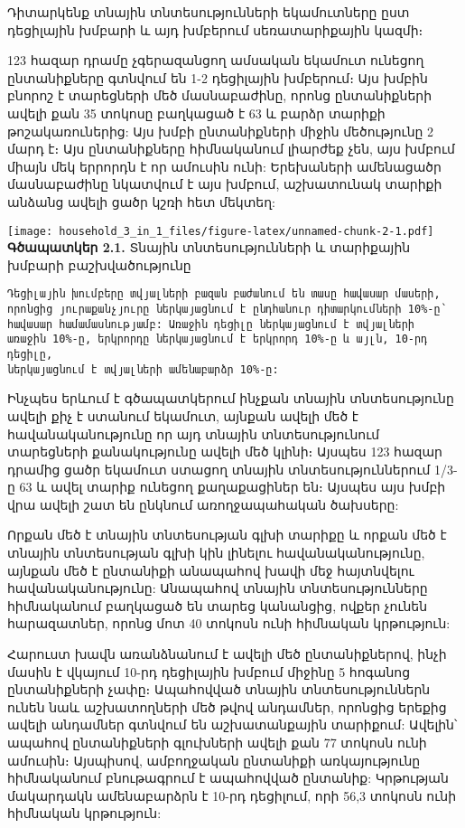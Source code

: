 \documentclass[
]{article}
\begin{document}
Դիտարկենք տնային տնտեսությունների եկամուտները ըստ դեցիլային խմբարի և այդ
խմբերում սեռատարիքային կազմի։

123 հազար դրամը չգերազանցող ամսական եկամուտ ունեցող ընտանիքները գտնվում
են 1-2 դեցիլային խմբերում։ Այս խմբին բնորոշ է տարեցների մեծ մասնաբաժինը,
որոնց ընտանիքների ավելի քան 35 տոկոսը բաղկացած է 63 և բարձր տարիքի
թոշակառուներից: Այս խմբի ընտանիքների միջին մեծությունը 2 մարդ է։ Այս
ընտանիքները հիմնականում լիարժեք չեն, այս խմբում միայն մեկ երրորդն է որ
ամուսին ունի: Երեխաների ամենացածր մասնաբաժինը նկատվում է այս խմբում,
աշխատունակ տարիքի անձանց ավելի ցածր կշռի հետ մեկտեղ:

\texttt{[image: household\_3\_in\_1\_files/figure-latex/unnamed-chunk-2-1.pdf]}
\textbf{Գծապատկեր 2.1.} Տնային տնտեսությունների և տարիքային խմբարի
բաշխվածությունը

\begin{verbatim}
Դեցիլային խումբերը տվյալների բազան բաժանում են տասը հավասար մասերի,
որոնցից յուրաքանչյուրը ներկայացնում է ընդհանուր դիտարկումների 10%-ը՝
հավասար համամասնությամբ: Առաջին դեցիլը ներկայացնում է տվյալների 
առաջին 10%-ը, երկրորդը ներկայացնում է երկրորդ 10%-ը և այլն, 10-րդ դեցիլը, 
ներկայացնում է տվյալների ամենաբարձր 10%-ը:
\end{verbatim}

Ինչպես երևում է գծապատկերում ինչքան տնային տնտեսությունը ավելի քիչ է
ստանում եկամուտ, այնքան ավելի մեծ է հավանականությունը որ այդ տնային
տնտեսությունում տարեցների քանակությունը ավելի մեծ կլինի։ Այսպես 123
հազար դրամից ցածր եկամուտ ստացող տնային տնտեսություններում 1/3-ը 63 և
ավել տարիք ունեցող քաղաքացիներ են։ Այսպես այս խմբի վրա ավելի շատ են
ընկնում առողջապահական ծախսերը:

Որքան մեծ է տնային տնտեսության գլխի տարիքը և որքան մեծ է տնային
տնտեսության գլխի կին լինելու հավանականությունը, այնքան մեծ է ընտանիքի
անապահով խավի մեջ հայտնվելու հավանականությունը: Անապահով տնային
տնտեսությունները հիմնականում բաղկացած են տարեց կանանցից, ովքեր չունեն
հարազատներ, որոնց մոտ 40 տոկոսն ունի հիմնական կրթություն:

Հարուստ խավն առանձնանում է ավելի մեծ ընտանիքներով, ինչի մասին է վկայում
10-րդ դեցիլային խմբում միջինը 5 հոգանոց ընտանիքների չափը։ Ապահովված
տնային տնտեսություններն ունեն նաև աշխատողների մեծ թվով անդամներ, որոնցից
երեքից ավելի անդամներ գտնվում են աշխատանքային տարիքում: Ավելին՝ ապահով
ընտանիքների գլուխների ավելի քան 77 տոկոսն ունի ամուսին։ Այսպիսով,
ամբողջական ընտանիքի առկայությունը հիմնականում բնութագրում է ապահովված
ընտանիք: Կրթության մակարդակն ամենաբարձրն է 10-րդ դեցիլում, որի 56,3
տոկոսն ունի հիմնական կրթություն:
\end{document}
